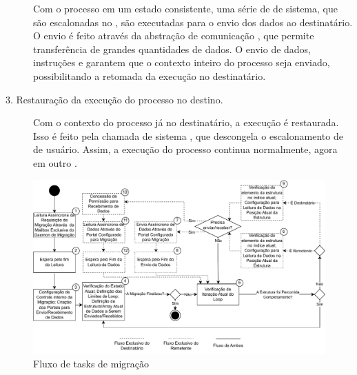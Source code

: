 \begin{description}
    Com o processo em um estado consistente, uma série de \tasks de sistema, que são escalonadas no \mcore, são executadas para o envio dos dados ao \cluster destinatário. O envio é feito através da abstração de comunicação \portal, que permite transferência de grandes quantidades de dados. O envio de dados, instruções e \uarea garantem que o contexto inteiro do processo seja enviado, possibilitando a retomada da execução no \cluster destinatário.
    
    \item[3. Restauração da execução do processo no \cluster destino.] \hfill
	
    Com o contexto do processo já no \cluster destinatário, a execução é restaurada. Isso é feito pela chamada de sistema \unfreeze, que descongela o escalonamento de \threads de usuário. Assim, a execução do processo continua normalmente, agora em outro \cluster.
\end{description}

\begin{figure}[b]
    \centering
    \includegraphics[width=\linewidth]{content/images/migration-steps-tasks.pdf}
    \caption{Fluxo de tasks de migração}
    \label{fig.migrationsteps}
\end{figure}

